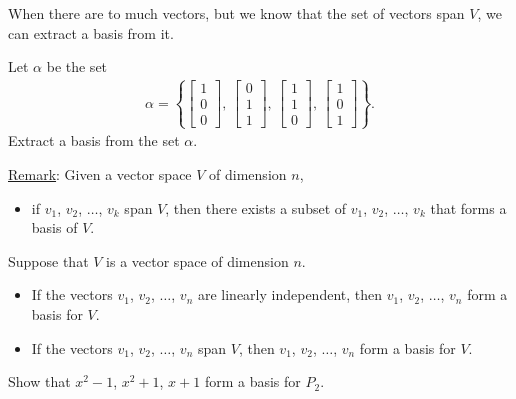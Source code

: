 \documentclass[12pt,a4paper]{article}
\newcounter{example}[section]
\begin{document}
	\newpage
	
	When there are to much vectors, but we know that the set of vectors span $V$, we can extract a basis from it.
	
	\vspace*{16pt}
	
	\begin{example}
	Let $\alpha$ be the set
		\begin{align*}
		\alpha = \left\lbrace
			\begin{bmatrix}
			1 \\ 0 \\ 0
			\end{bmatrix} , \,
			\begin{bmatrix}
			0 \\ 1 \\ 1
			\end{bmatrix} , \,
			\begin{bmatrix}
			1 \\ 1 \\ 0
			\end{bmatrix} , \,
			\begin{bmatrix}
			1 \\ 0 \\ 1
			\end{bmatrix}
			\right\rbrace .
		\end{align*}
	Extract a basis from the set $\alpha$.
	\end{example}
	
	\vfill
	
	\noindent\underline{Remark}: Given a vector space $V$ of dimension $n$,
		\begin{itemize}
		\item if $v_1$, $v_2$, $\ldots$, $v_k$ span $V$, then there exists a subset of $v_1$, $v_2$, $\ldots$, $v_k$ that forms a basis of $V$.
		\end{itemize}
		
	\newpage
	
	\begin{theorem}
	Suppose that $V$ is a vector space of dimension $n$.
		\begin{itemize}
		\item If the vectors $v_1$, $v_2$, $\ldots$, $v_n$ are linearly independent, then $v_1$, $v_2$, $\ldots$, $v_n$ form a basis for $V$.
		\item If the vectors $v_1$, $v_2$, $\ldots$, $v_n$ span $V$, then $v_1$, $v_2$, $\ldots$, $v_n$ form a basis for $V$.
		\end{itemize}
	\end{theorem}
	
	\vspace*{16pt}
	
	\begin{example}
	Show that $x^2 - 1$, $x^2 + 1$, $x+1$ form a basis for $P_2$.
	\end{example}
	
\end{document}
